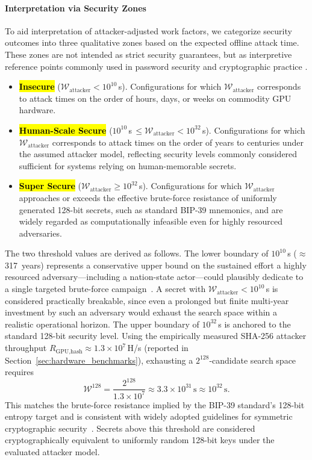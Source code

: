 \documentclass[mathematics,article,accept,pdftex,moreauthors]{Definitions/mdpi}
\begin{document}
\paragraph*{Interpretation via Security Zones}
To aid interpretation of attacker-adjusted work factors, we categorize security outcomes into three qualitative zones based on the expected offline attack time. These zones are not intended as strict security guarantees, but as interpretive reference points commonly used in password security and cryptographic practice \cite{Bonneau2012a}.
\begin{itemize}
\item \textbf{\hl{Insecure}} ($\mathcal{W}_{\text{attacker}} < 10^{10}$\,s). Configurations for which $\mathcal{W}_{\text{attacker}}$ corresponds to attack times on the order of hours, days, or weeks on commodity GPU hardware.
\item \textbf{\hl{Human-Scale Secure}} ($10^{10}$\,s\,$\le \mathcal{W}_{\text{attacker}} < 10^{32}$\,s). Configurations for which $\mathcal{W}_{\text{attacker}}$ corresponds to attack times on the order of years to centuries under the assumed attacker model, reflecting security levels commonly considered sufficient for systems relying on human-memorable secrets.
\item \textbf{\hl{Super Secure}} ($\mathcal{W}_{\text{attacker}} \ge 10^{32}$\,s). Configurations for which $\mathcal{W}_{\text{attacker}}$ approaches or exceeds the effective brute-force resistance of uniformly generated 128-bit secrets, such as standard BIP-39 mnemonics, and are widely regarded as computationally infeasible even for highly resourced adversaries.
\end{itemize}

{The two threshold values are derived as follows. The lower boundary of $10^{10}$\,s ($\approx$317~years) represents a conservative upper bound on the sustained effort a highly resourced adversary---including a nation-state actor---could plausibly dedicate to a single targeted brute-force campaign~\cite{Bonneau2012a}. A secret with $\mathcal{W}_{\text{attacker}} < 10^{10}$\,s is considered practically breakable, since even a prolonged but finite multi-year investment by such an adversary would exhaust the search space within a realistic operational horizon. The upper boundary of $10^{32}$\,s is anchored to the standard 128-bit security level. Using the empirically measured SHA-256 attacker throughput $R_{\text{GPU,hash}} \approx 1.3 \times 10^{7}$\,H/s (reported in Section~\ref{sec:hardware_benchmarks}), exhausting a $2^{128}$-candidate search space requires
\begin{equation}
\mathcal{W}^{128} = \frac{2^{128}}{1.3 \times 10^{7}} \approx 3.3 \times 10^{31}\,\text{s} \approx 10^{32}\,\text{s}.
\label{eq:w128_threshold}
\end{equation}
This matches the brute-force resistance implied by the BIP-39 standard's 128-bit entropy target and is consistent with widely adopted guidelines for symmetric cryptographic security~\cite{Bonneau2012a}. Secrets above this threshold are considered cryptographically equivalent to uniformly random 128-bit keys under the evaluated attacker model.}
\end{document}
